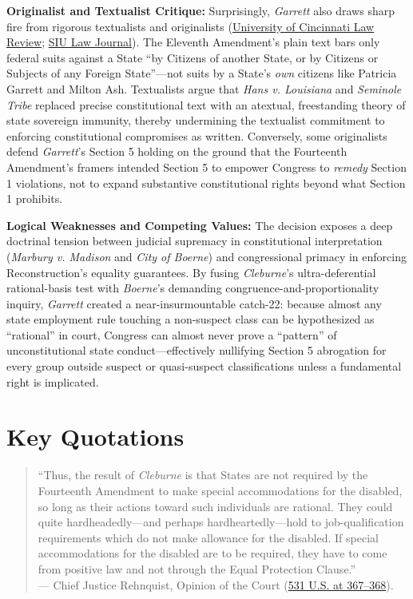 \documentclass[12pt]{article}
\begin{document}
\textbf{Originalist and Textualist Critique:} Surprisingly, \textit{Garrett} also draws sharp fire from rigorous textualists and originalists (\href{https://scholarship.law.uc.edu/cgi/viewcontent.cgi?article=1475&context=uclr}{University of Cincinnati Law Review}; \href{https://law.siu.edu/_common/documents/law-journal/articles-2016/fall-2016/6-sample-article-sm.pdf}{SIU Law Journal}). The Eleventh Amendment's plain text bars only federal suits against a State ``by Citizens of another State, or by Citizens or Subjects of any Foreign State''---not suits by a State's \textit{own} citizens like Patricia Garrett and Milton Ash. Textualists argue that \textit{Hans v. Louisiana} and \textit{Seminole Tribe} replaced precise constitutional text with an atextual, freestanding theory of state sovereign immunity, thereby undermining the textualist commitment to enforcing constitutional compromises as written. Conversely, some originalists defend \textit{Garrett}'s Section 5 holding on the ground that the Fourteenth Amendment's framers intended Section 5 to empower Congress to \textit{remedy} Section 1 violations, not to expand substantive constitutional rights beyond what Section 1 prohibits.

\textbf{Logical Weaknesses and Competing Values:} The decision exposes a deep doctrinal tension between judicial supremacy in constitutional interpretation (\textit{Marbury v. Madison} and \textit{City of Boerne}) and congressional primacy in enforcing Reconstruction's equality guarantees. By fusing \textit{Cleburne}'s ultra-deferential rational-basis test with \textit{Boerne}'s demanding congruence-and-proportionality inquiry, \textit{Garrett} created a near-insurmountable catch-22: because almost any state employment rule touching a non-suspect class can be hypothesized as ``rational'' in court, Congress can almost never prove a ``pattern'' of unconstitutional state conduct---effectively nullifying Section 5 abrogation for every group outside suspect or quasi-suspect classifications unless a fundamental right is implicated.

\section{Key Quotations}

\begin{quote}
``Thus, the result of \textit{Cleburne} is that States are not required by the Fourteenth Amendment to make special accommodations for the disabled, so long as their actions toward such individuals are rational. They could quite hardheadedly---and perhaps hardheartedly---hold to job-qualification requirements which do not make allowance for the disabled. If special accommodations for the disabled are to be required, they have to come from positive law and not through the Equal Protection Clause.'' \\
--- Chief Justice Rehnquist, Opinion of the Court (\href{https://supreme.justia.com/cases/federal/us/531/356/}{531 U.S. at 367--368}).
\end{quote}
\end{document}
